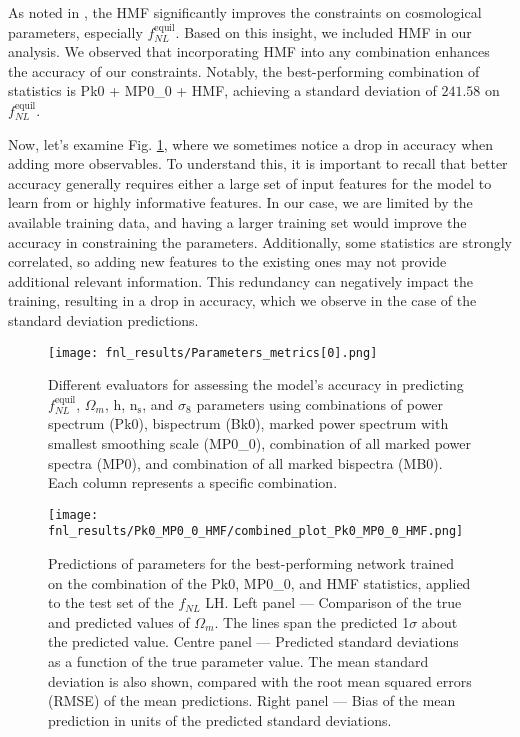 As noted in \cite{Jung_2023, jung2024quijotepngoptimizingsummarystatistics}, the HMF significantly improves the constraints on cosmological parameters, especially $f_{NL}^{\mathrm{equil}}$. Based on this insight, we included HMF in our analysis. We observed that incorporating HMF into any combination enhances the accuracy of our constraints. Notably, the best-performing combination of statistics is Pk0 + MP0\_0 + HMF, achieving a standard deviation of $241.58$ on $f_{NL}^\mathrm{equil}$.


Now, let's examine Fig. \ref{fig:parameters_metrics}, where we sometimes notice a drop in accuracy when adding more observables. To understand this, it is important to recall that better accuracy generally requires either a large set of input features for the model to learn from or highly informative features. In our case, we are limited by the available training data, and having a larger training set would improve the accuracy in constraining the parameters. Additionally, some statistics are strongly correlated, so adding new features to the existing ones may not provide additional relevant information. This redundancy can negatively impact the training, resulting in a drop in accuracy, which we observe in the case of the standard deviation predictions.

\begin{figure}[htbp]
    \centering
    \texttt{[image: fnl\_results/Parameters\_metrics[0].png]}
    \caption{Different evaluators for assessing the model's accuracy in predicting $f_{NL}^{\mathrm{equil}}$, $\Omega_{m}$, $\mathrm{h}$, $\mathrm{n_{s}}$, and $\sigma_{8}$ parameters using combinations of power spectrum (Pk0), bispectrum (Bk0), marked power spectrum with smallest smoothing scale (MP0\_0), combination of all marked power spectra (MP0), and combination of all marked bispectra (MB0). Each column represents a specific combination.}
    \label{fig:parameters_metrics}
\end{figure}

\begin{figure}[htbp]
    \centering
    \texttt{[image: fnl\_results/Pk0\_MP0\_0\_HMF/combined\_plot\_Pk0\_MP0\_0\_HMF.png]}
    \caption{Predictions of parameters for the best-performing network trained on the combination of the Pk0, MP0\_0, and HMF statistics, applied to the test set of the $f_{NL}$ LH. Left panel — Comparison of the true and predicted values of $\Omega_m$. The lines span the predicted 1$\sigma$ about the predicted value. Centre panel — Predicted standard deviations as a function of the true parameter value. The mean standard deviation is also shown, compared with the root mean squared errors (RMSE) of the mean predictions. Right panel — Bias of the mean prediction in units of the predicted standard deviations.}
    \label{fig:Pk0_MP0_0_HMF}
\end{figure}


